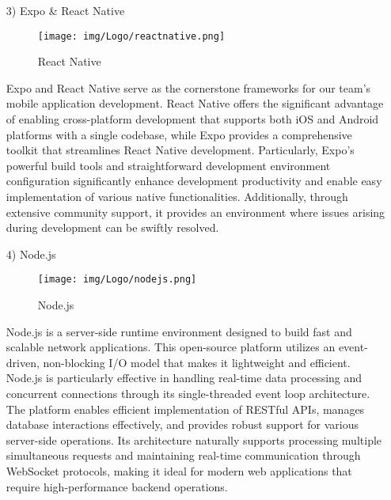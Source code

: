 \documentclass[conference]{IEEEtran}
\begin{document}
\begin{enumerate}
\begin{itemize}
        \vspace{1em}
        
        \item [3)] Expo \& React Native\par
        \vspace{0.3em}
        \begin{figure}[h]
        \centering
        \texttt{[image: img/Logo/reactnative.png]}
        \centering
        \caption{React Native} 
        \end{figure}\par
        \vspace{0.3em}
        Expo and React Native serve as the cornerstone frameworks for our team's mobile application development. React Native offers the significant advantage of enabling cross-platform development that supports both iOS and Android platforms with a single codebase, while Expo provides a comprehensive toolkit that streamlines React Native development. Particularly, Expo's powerful build tools and straightforward development environment configuration significantly enhance development productivity and enable easy implementation of various native functionalities. Additionally, through extensive community support, it provides an environment where issues arising during development can be swiftly resolved.

        \vspace{1em}
        
        \item [4)] Node.js\par
        \vspace{0.3em}
        \begin{figure}[h]
        \centering
        \texttt{[image: img/Logo/nodejs.png]}
        \centering
        \caption{Node.js} 
        \end{figure}\par
        \vspace{0.3em}
        Node.js is a server-side runtime environment designed to build fast and scalable network applications. This open-source platform utilizes an event-driven, non-blocking I/O model that makes it lightweight and efficient. Node.js is particularly effective in handling real-time data processing and concurrent connections through its single-threaded event loop architecture. The platform enables efficient implementation of RESTful APIs, manages database interactions effectively, and provides robust support for various server-side operations. Its architecture naturally supports processing multiple simultaneous requests and maintaining real-time communication through WebSocket protocols, making it ideal for modern web applications that require high-performance backend operations.


\end{itemize}
\end{enumerate}
\end{document}
